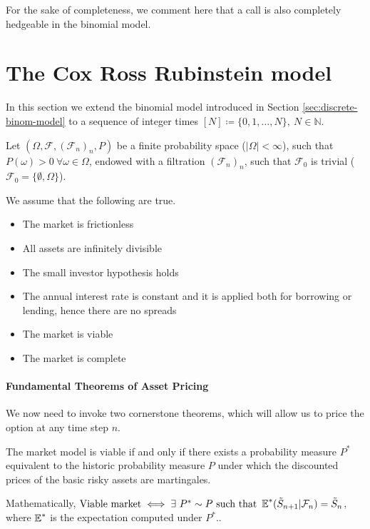 For the sake of completeness, we comment here that a call is also completely hedgeable in the binomial model.






\section{The Cox Ross Rubinstein model}
\label{sec:cox-ross-rubinstein}

In this section we extend the binomial model introduced in Section \ref{sec:discrete-binom-model} to a sequence of integer times $ [N] \coloneqq \{ 0, 1, \dots, N \}, \  N \in \mathbb{N} $.

Let $ (\Omega, \mathcal{F}, (\mathcal{F}_n)_n, P) $ be a finite probability space ($ |\Omega| < \infty $), such that $ P(\omega) > 0 \  \forall \omega \in \Omega $, endowed with a filtration $ (\mathcal{F}_n)_n $, such that $ \mathcal{F}_0 $ is trivial ($ \mathcal{F}_0 = \{ \emptyset, \Omega \} $).

We assume that the following are true.
\begin{itemize}
	\item The market is frictionless
	\item All assets are infinitely divisible
	\item The small investor hypothesis holds
	\item The annual interest rate is constant and it is applied both for borrowing or lending, hence there are no spreads
	\item The market is viable
	\item The market is complete
\end{itemize}


\paragraph{Fundamental Theorems of Asset Pricing}

We now need to invoke two cornerstone theorems, which will allow us to price the option at any time step $ n $.

\begin{thm}
	\label{thm:discrete-ftoap1}
	The market model is viable if and only if there exists a probability measure $ P^* $ equivalent to the historic probability measure $ P $ under which the discounted prices of the basic risky assets are martingales.
	
	Mathematically,
	$ \text{Viable market} \iff \exists \  P^* \sim P \text{ such that } \operatorname{\mathbb{E}}^*( \tilde{S}_{n+1} | \mathcal{F}_n ) = \tilde{S}_{n} $, where $ \operatorname{\mathbb{E}}^* $ is the expectation computed under $ P^* $..
\end{thm}

